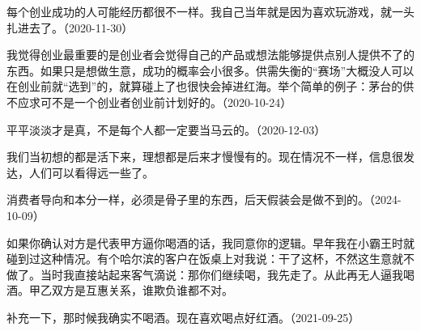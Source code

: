 每个创业成功的人可能经历都很不一样。我自己当年就是因为喜欢玩游戏，就一头扎进去了。（2020-11-30）


我觉得创业最重要的是创业者会觉得自己的产品或想法能够提供点别人提供不了的东西。如果只是想做生意，成功的概率会小很多。供需失衡的“赛场”大概没人可以在创业前就“选到”的，就算碰上了也很快会掉进红海。举个简单的例子：茅台的供不应求可不是一个创业者创业前计划好的。（2020-10-24）


平平淡淡才是真，不是每个人都一定要当马云的。（2020-12-03）


我们当初想的都是活下来，理想都是后来才慢慢有的。现在情况不一样，信息很发达，人们可以看得远一些了。


消费者导向和本分一样，必须是骨子里的东西，后天假装会是做不到的。（2024-10-09）


如果你确认对方是代表甲方逼你喝酒的话，我同意你的逻辑。早年我在小霸王时就碰到过这种情况。有个哈尔滨的客户在饭桌上对我说：干了这杯，不然这生意就不做了。当时我直接站起来客气滴说：那你们继续喝，我先走了。从此再无人逼我喝酒。甲乙双方是互惠关系，谁欺负谁都不对。

补充一下，那时候我确实不喝酒。现在喜欢喝点好红酒。（2021-09-25）
